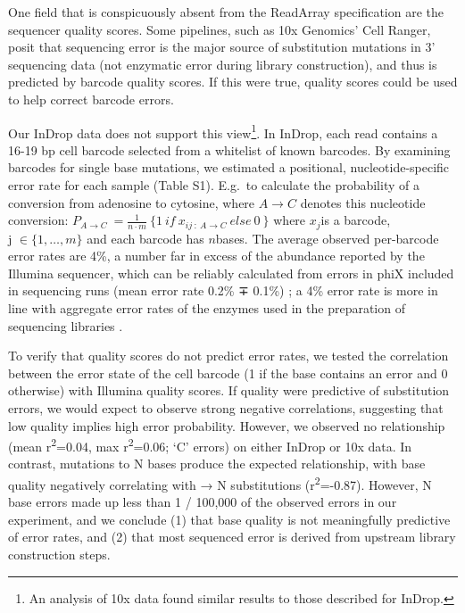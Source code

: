 
One field that is conspicuously absent from the ReadArray specification are the sequencer quality scores.  
Some pipelines, such as 10x Genomics' Cell Ranger, posit that sequencing error is the major source of substitution mutations in 3' sequencing data (not enzymatic error during library construction), and thus is predicted by barcode quality scores. 
If this were true, quality scores could be used to help correct barcode errors. 

Our InDrop data does not support this view\footnote{An analysis of 10x data found similar results to those described for InDrop.}. 
In InDrop, each read contains a 16-19 bp cell barcode selected from a whitelist of known barcodes. 
By examining barcodes for single base mutations, we estimated a positional, nucleotide-specific error rate for each sample (Table S1). E.g.\ to calculate the probability of a conversion from adenosine to cytosine, where \(A \rightarrow C\) denotes this nucleotide conversion: \(P_{A \rightarrow C}\  = \frac{1}{n \cdot m}\ \{ 1\ if\ x_{ij\ :\ A \rightarrow C}\ else\ 0\ \}\) where \(x_{j}\)is a barcode, \(\text{j\ } \in \{ 1,\ldots,m\}\) and each barcode has \(n\)bases. %
The average observed per-barcode error rates are 4\%, a number far in excess of the abundance reported by the Illumina sequencer, which can be reliably calculated from errors in phiX included in sequencing runs (mean error rate 0.2\% ∓ 0.1\%) \citep{Manley2016}; a 4\% error rate is more in line with aggregate error rates of the enzymes used in the preparation of sequencing libraries \citep{Zilionis2017}.

To verify that quality scores do not predict error rates, we tested the correlation between the error state of the cell barcode (1 if the base contains an error and 0 otherwise) with Illumina quality scores. 
If quality were predictive of substitution errors, we would expect to observe strong negative correlations, suggesting that low quality implies high error probability. 
However, we observed no relationship (mean r\textsuperscript{2}=0.04, max r\textsuperscript{2}=0.06; `C' errors) on either InDrop or 10x data.
In contrast, mutations to N bases produce the expected relationship, with base quality negatively correlating with → N substitutions (r\textsuperscript{2}=-0.87). However, N base errors made up less than 1 / 100,000 of the observed errors in our experiment, and we conclude (1) that base quality is not meaningfully predictive of error rates, and (2) that most sequenced error is derived from upstream library construction steps.

